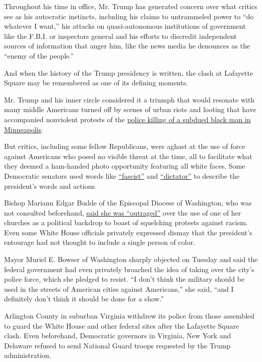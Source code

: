 Throughout his time in office, Mr. Trump has generated concern over what
critics see as his autocratic instincts, including his claims to
untrammeled power to ``do whatever I want,'' his attacks on
quasi-autonomous institutions of government like the F.B.I. or
inspectors general and his efforts to discredit independent sources of
information that anger him, like the news media he denounces as the
``enemy of the people.''

And when the history of the Trump presidency is written, the clash at
Lafayette Square may be remembered as one of its defining moments.

Mr. Trump and his inner circle considered it a triumph that would
resonate with many middle Americans turned off by scenes of urban riots
and looting that have accompanied nonviolent protests of the
\href{https://www.nytimes3xbfgragh.onion/2020/05/31/us/george-floyd-investigation.html}{police
killing of a subdued black man in Minneapolis}.

But critics, including some fellow Republicans, were aghast at the use
of force against Americans who posed no visible threat at the time, all
to facilitate what they deemed a ham-handed photo opportunity featuring
all white faces. Some Democratic senators used words like
\href{https://twitter.com/RonWyden/status/1267605801549664256}{``fascist''}
and
\href{https://twitter.com/KamalaHarris/status/1267603100656898049}{``dictator''}
to describe the president's words and actions.

Bishop Mariann Edgar Budde of the Episcopal Diocese of Washington, who
was not consulted beforehand,
\href{https://www.nytimes3xbfgragh.onion/2020/06/02/us/politics/trump-church.html}{said
she was ``outraged''} over the use of one of her churches as a political
backdrop to boast of squelching protests against racism. Even some White
House officials privately expressed dismay that the president's
entourage had not thought to include a single person of color.

Mayor Muriel E. Bowser of Washington sharply objected on Tuesday and
said the federal government had even privately broached the idea of
taking over the city's police force, which she pledged to resist. ``I
don't think the military should be used in the streets of American
cities against Americans,'' she said, ``and I definitely don't think it
should be done for a show.''

Arlington County in suburban Virginia withdrew its police from those
assembled to guard the White House and other federal sites after the
Lafayette Square clash. Even beforehand, Democratic governors in
Virginia, New York and Delaware refused to send National Guard troops
requested by the Trump administration.

